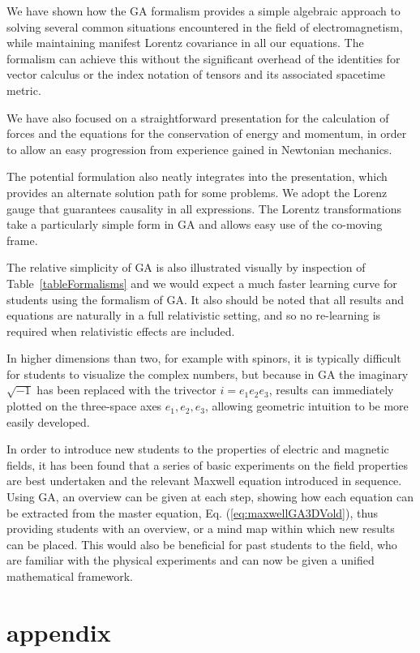 \documentclass[12pt,aps,prb,preprint]{revtex4}   %
\begin{document}
We have shown how the GA formalism provides a simple algebraic approach to solving several common situations encountered in the field of electromagnetism, while maintaining manifest Lorentz covariance in all our equations.
The formalism can achieve this without the significant overhead of the identities for vector calculus or the index notation of tensors and its associated spacetime metric.

We have also focused on a straightforward presentation for the calculation of forces and the equations for the conservation of energy and momentum, in order to allow an easy progression from experience gained in Newtonian mechanics.

The potential formulation also neatly integrates into the presentation, which provides an alternate solution path for some problems.  We adopt the Lorenz gauge that guarantees causality in all expressions. The Lorentz transformations take a particularly simple form in GA and allows easy use of the co-moving frame.

The relative simplicity of GA  is also illustrated visually by inspection of Table~\ref{tableFormalisms} and we would expect a much faster learning curve for students using the formalism of GA.
It also should be noted that all results and equations are naturally in a full relativistic setting, and so no re-learning is required when relativistic effects are included.

In higher dimensions than two, for example with spinors, it is typically difficult for students to visualize the complex numbers, but because in GA the imaginary $ \sqrt{-1} $ has been replaced with the trivector $ i = e_1 e_2 e_3 $, results can immediately plotted on the three-space axes $ e_1, e_2, e_3 $, allowing geometric intuition to be more easily developed.

In order to introduce new students to the properties of electric and magnetic fields, it has been found that a series of basic experiments on the field properties are best undertaken and the relevant Maxwell equation introduced in sequence.  Using GA, an overview can be given at each step, showing how each equation can be extracted from the master equation, Eq. (\ref{eq:maxwellGA3DVold}), thus providing students with an overview, or a mind map within which new results can be placed.  This would also be beneficial for past students to the field, who are familiar with the physical experiments and can now be given a unified mathematical framework.


\section{appendix}
\end{document}
